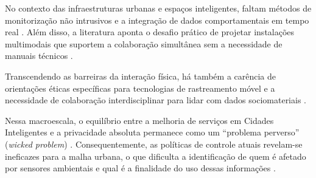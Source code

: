 \documentclass[
	12pt,				%
	oneside,			%
	a4paper,			%
	english,			%
	brazil				%
	]{abntex2ppgsi}
\begin{document}
    No contexto das infraestruturas urbanas e espaços inteligentes, faltam métodos de monitorização não intrusivos e a integração de dados comportamentais em tempo real \cite{bavaresco2019technological}. Além disso, a literatura aponta o desafio prático de projetar instalações multimodais que suportem a colaboração simultânea sem a necessidade de manuais técnicos \cite{Bartram2022, Alhakamy2021, Alhakamy2020246, Trajkova2020}.

    Transcendendo as barreiras da interação física, há também a carência de orientações éticas específicas para tecnologias de rastreamento móvel e a necessidade de colaboração interdisciplinar para lidar com dados sociomateriais \cite{kaufmann2021ethical}. 

    Nessa macroescala, o equilíbrio entre a melhoria de serviços em Cidades Inteligentes e a privacidade absoluta permanece como um ``problema perverso'' (\textit{wicked problem}) \cite{Meireles2016, Chowdhury2016}. Consequentemente, as políticas de controle atuais revelam-se ineficazes para a malha urbana, o que dificulta a identificação de quem é afetado por sensores ambientais e qual é a finalidade do uso dessas informações \cite{Mashhadi2014}.
\end{document}

